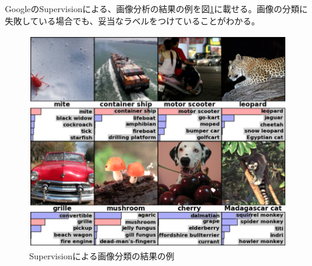 GoogleのSupervisionによる、画像分析の結果の例を図\ref{c3_supervision}に載せる。画像の分類に失敗している場合でも、妥当なラベルをつけていることがわかる。\begin{figure}[tbp]
 \begin{center}
  \includegraphics[width=120mm]{img/c3/supervision}
 \end{center}
 \caption{Supervisionによる画像分類の結果の例}
 \label{c3_supervision}
\end{figure}

